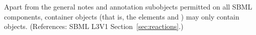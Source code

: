 Apart from the general notes and annotation subobjects permitted on all
SBML components, \ListOfSpeciesReferences container objects (that is, the
\Reaction elements  and ) may
only contain \SpeciesReference objects.  (References: SBML L3V1
Section~\ref{sec:reactions}.)
